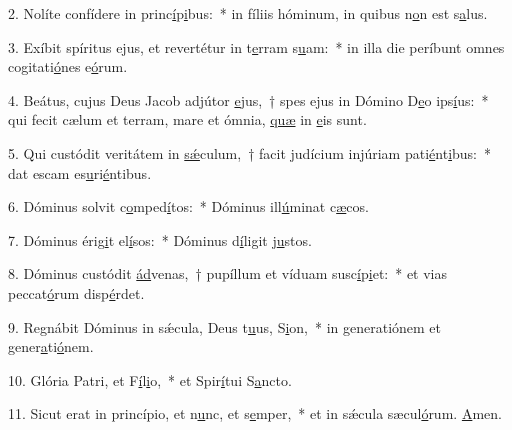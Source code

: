 2. Nolíte confídere in princ\uline{í}p\uline{i}bus:~* in fíliis hóminum, in quibus n\uline{o}n est s\uline{a}lus.\par 
3. Exíbit spíritus ejus, et revertétur in t\uline{e}rram s\uline{u}am:~* in illa die períbunt omnes cogitati\uline{ó}nes e\uline{ó}rum.\par 
4. Beátus, cujus Deus Jacob adjútor \uline{e}jus,~† spes ejus in Dómino D\uline{e}o ips\uline{í}us:~* qui fecit cælum et terram, mare et ómnia, \uline{quæ} in \uline{e}is sunt.\par 
5. Qui custódit veritátem in \uline{sǽ}culum,~† facit judícium injúriam pati\uline{é}nt\uline{i}bus:~* dat escam es\uline{u}ri\uline{é}ntibus.\par 
6. Dóminus solvit c\uline{o}mped\uline{í}tos:~* Dóminus ill\uline{ú}minat c\uline{æ}cos.\par 
7. Dóminus érig\uline{i}t el\uline{í}sos:~* Dóminus d\uline{í}ligit j\uline{u}stos.\par 
8. Dóminus custódit \uline{ád}venas,~† pupíllum et víduam susc\uline{í}p\uline{i}et:~* et vias peccat\uline{ó}rum disp\uline{é}rdet.\par 
9. Regnábit Dóminus in sǽcula, Deus t\uline{u}us, S\uline{i}on,~* in generatiónem et gener\uline{a}ti\uline{ó}nem.\par 
10. Glória Patri, et F\uline{í}l\uline{i}o,~* et Spir\uline{í}tui S\uline{a}ncto.\par 
11. Sicut erat in princípio, et n\uline{u}nc, et s\uline{e}mper,~* et in sǽcula sæcul\uline{ó}rum. \uline{A}men.\par 
